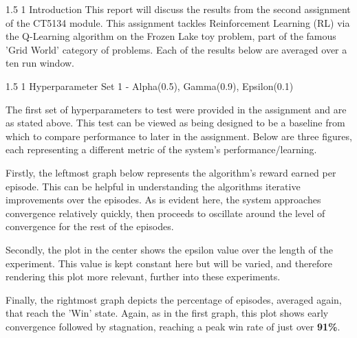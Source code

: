 \documentclass[a4paper,9pt]{scrartcl}
\title{\titletext}
\author{Michael Rice}
\makeatletter
\renewcommand{\section}{\@startsection{section}{1}{0mm}
  {1.5\baselineskip}
  {1\baselineskip} 
  {\normalfont\Large\bfseries}}
\makeatother
\begin{document}
\maketitle

\section{Introduction}
This report will discuss the results from the second assignment of the CT5134 module. This assignment tackles Reinforcement Learning (RL) via the 
Q-Learning algorithm on the Frozen Lake toy problem, part of the famous 'Grid World' category of problems. Each of the results below are averaged
over a ten run window. 

\section{Hyperparameter Set 1 - Alpha(0.5), Gamma(0.9), Epsilon(0.1)}

The first set of hyperparameters to test were provided in the assignment and are as stated above. This test can be viewed as being designed to be 
a baseline from which to compare performance to later in the assignment. Below are three figures, each representing a different metric of the 
system's performance/learning. 

Firstly, the leftmost graph below represents the algorithm's reward earned per episode. This can be helpful in understanding the algorithms iterative
improvements over the episodes. As is evident here, the system approaches convergence relatively quickly, then proceeds to oscillate around
the level of convergence for the rest of the episodes. 

Secondly, the plot in the center shows the epsilon value over the length of the experiment. This value is kept constant here but will be varied,
and therefore rendering this plot more relevant, further into these experiments. 

Finally, the rightmost graph depicts the percentage of episodes, averaged again, that reach the 'Win' state. Again, as in the first graph, this
plot shows early convergence followed by stagnation, reaching a peak win rate of just over \textbf{91\%}.
\end{document}
